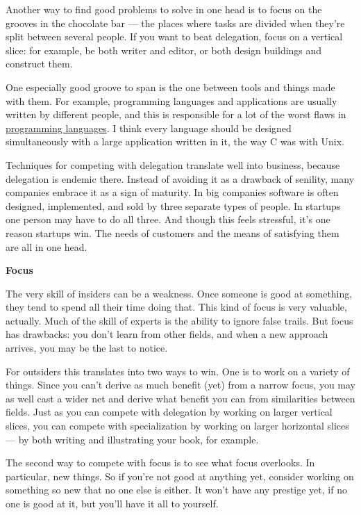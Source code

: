 Another way to find good problems to solve in one head is to focus on
the grooves in the chocolate bar --- the places where tasks are divided
when they're split between several people. If you want to beat
delegation, focus on a vertical slice: for example, be both writer and
editor, or both design buildings and construct them.

One especially good groove to span is the one between tools and things
made with them. For example, programming languages and applications are
usually written by different people, and this is responsible for a lot
of the worst flaws in \href{hundred.html}{programming languages}. I
think every language should be designed simultaneously with a large
application written in it, the way C was with Unix.

Techniques for competing with delegation translate well into business,
because delegation is endemic there. Instead of avoiding it as a
drawback of senility, many companies embrace it as a sign of maturity.
In big companies software is often designed, implemented, and sold by
three separate types of people. In startups one person may have to do
all three. And though this feels stressful, it's one reason startups
win. The needs of customers and the means of satisfying them are all in
one head.

\textbf{Focus}

The very skill of insiders can be a weakness. Once someone is good at
something, they tend to spend all their time doing that. This kind of
focus is very valuable, actually. Much of the skill of experts is the
ability to ignore false trails. But focus has drawbacks: you don't learn
from other fields, and when a new approach arrives, you may be the last
to notice.

For outsiders this translates into two ways to win. One is to work on a
variety of things. Since you can't derive as much benefit (yet) from a
narrow focus, you may as well cast a wider net and derive what benefit
you can from similarities between fields. Just as you can compete with
delegation by working on larger vertical slices, you can compete with
specialization by working on larger horizontal slices --- by both
writing and illustrating your book, for example.

The second way to compete with focus is to see what focus overlooks. In
particular, new things. So if you're not good at anything yet, consider
working on something so new that no one else is either. It won't have
any prestige yet, if no one is good at it, but you'll have it all to
yourself.

